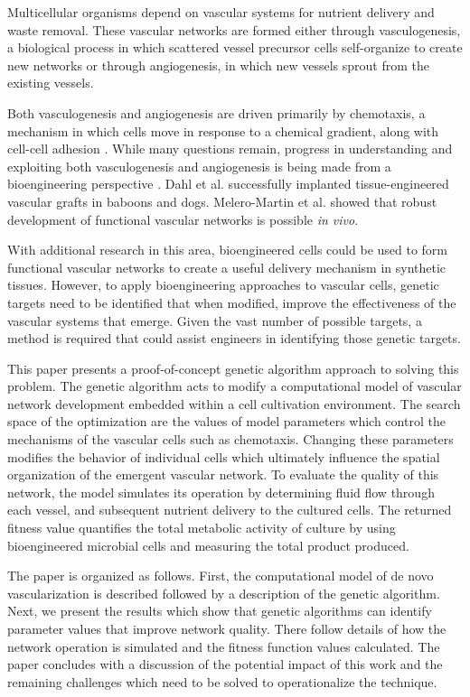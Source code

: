 Multicellular organisms depend on vascular systems for nutrient delivery and waste
removal\cite{delindavis:bloodevolution}. These vascular networks are formed either
through vasculogenesis, a biological process in which scattered vessel precursor
cells self-organize to create new networks or through angiogenesis, in which new
vessels sprout from the existing vessels.

Both vasculogenesis and angiogenesis are driven primarily by chemotaxis, a mechanism
in which cells move in response to a chemical gradient, along with cell-cell adhesion
\cite{delindavis:Merks2008ContactInhibited}. While many questions remain, progress in
understanding and exploiting both vasculogenesis and angiogenesis is being made from
a bioengineering perspective  \cite{Kaully2009VascularizationThe}
\cite{Lovett2009Vascularization}. Dahl et al.
\cite{delindavis:vascularnetworksinorgandevelopment} successfully implanted
tissue-engineered vascular grafts in baboons and dogs. Melero-Martin et al.
\cite{delindavis:bioengineeredvascularnetworks} showed that robust development of
functional vascular networks is possible \textit{in vivo}.

With additional research in this area, bioengineered cells could be used to form
functional vascular networks to create a useful delivery mechanism in synthetic
tissues. However, to apply bioengineering approaches to vascular cells, genetic
targets need to be identified that when modified, improve the effectiveness of the
vascular systems that emerge. Given the vast number of possible targets, a method is
required that could assist engineers in identifying those genetic targets.

This paper presents a proof-of-concept genetic algorithm approach to solving this
problem. The genetic algorithm acts to modify a computational model of vascular
network development embedded within a cell cultivation environment. The search space
of the optimization are the values of model parameters which control the mechanisms
of the vascular cells such as chemotaxis. Changing these parameters modifies the
behavior of individual cells which ultimately influence the spatial organization of
the emergent vascular network. To evaluate the quality of this network, the model
simulates its operation by determining fluid flow through each vessel, and subsequent
nutrient delivery to the cultured cells. The returned fitness value quantifies the
total metabolic activity of culture by using bioengineered microbial cells and
measuring the total product produced.

The paper is organized as follows. First, the computational model of de novo
vascularization is described followed by a description of the genetic algorithm.
Next, we present the results which show that genetic algorithms can identify
parameter values that improve network quality. There follow details of how the
network operation is simulated and the fitness function values calculated. The paper
concludes with a discussion of the potential impact of this work and the remaining
challenges which need to be solved to operationalize the technique.



